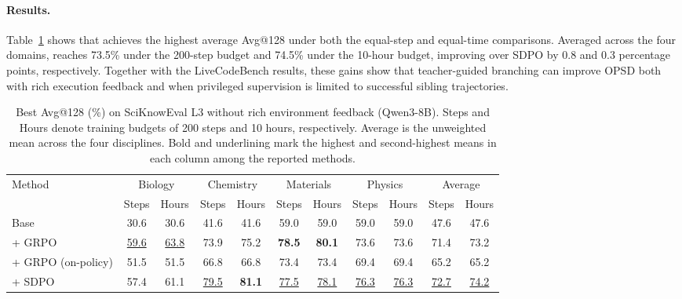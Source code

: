 \vspace{-0.1cm}\paragraph{Results.}
Table~\ref{tab:science-reasoning} shows that \method{} achieves the highest average Avg@128 under both the equal-step and equal-time comparisons. Averaged across the four domains, \method{} reaches 73.5\% under the 200-step budget and 74.5\% under the 10-hour budget, improving over SDPO by 0.8 and 0.3 percentage points, respectively. Together with the LiveCodeBench results, these gains show that teacher-guided branching can improve OPSD both with rich execution feedback and when privileged supervision is limited to successful sibling trajectories.

\begin{table}[t]
  \caption{Best Avg@128 (\%) on SciKnowEval L3 without rich environment feedback (Qwen3-8B). Steps and Hours denote training budgets of 200 steps and 10 hours, respectively. Average is the unweighted mean across the four disciplines. Bold and underlining mark the highest and second-highest means in each column among the reported methods.}
  \label{tab:science-reasoning}
  \centering
  \small
  \setlength{\tabcolsep}{3pt}
  
  
  
  
  
  
  
  
  
  \begin{tabular*}{\linewidth}{@{\hspace{6pt}\extracolsep{\fill}}l*{10}{c}@{\hspace{6pt}}}
    \toprule
    Method & \multicolumn{2}{c}{Biology} & \multicolumn{2}{c}{Chemistry} & \multicolumn{2}{c}{Materials} & \multicolumn{2}{c}{Physics} & \multicolumn{2}{c}{Average} \\
    \cmidrule(lr){2-3} \cmidrule(lr){4-5} \cmidrule(lr){6-7} \cmidrule(lr){8-9} \cmidrule(lr){10-11}
    & Steps & Hours & Steps & Hours & Steps & Hours & Steps & Hours & Steps & Hours \\
    \midrule
    Base & 30.6 & 30.6 & 41.6 & 41.6 & 59.0 & 59.0 & 59.0 & 59.0 & 47.6 & 47.6 \\
    + GRPO & \underline{59.6} & \underline{63.8} & 73.9 & 75.2 & \textbf{78.5} & \textbf{80.1} & 73.6 & 73.6 & 71.4 & 73.2 \\
    + GRPO (on-policy) & 51.5 & 51.5 & 66.8 & 66.8 & 73.4 & 73.4 & 69.4 & 69.4 & 65.2 & 65.2 \\
    + SDPO & 57.4 & 61.1 & \underline{79.5} & \textbf{81.1} & \underline{77.5} & \underline{78.1} & \underline{76.3} & \underline{76.3} & \underline{72.7} & \underline{74.2} \\
    

\end{tabular*}
\end{table}
